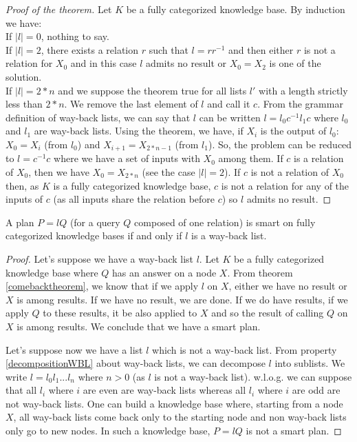 \documentclass[10pt,a4paper,draft]{article}
\begin{document}
\begin{proof}[Proof of the theorem]
Let $K$ be a fully categorized knowledge base. By induction we have: \\
If $|l| = 0$, nothing to say. \\
If $|l| = 2$, there exists a relation $r$ such that $l = r r^{-1}$ and then either $r$ is not a relation for $X_0$ and in this case $l$ admits no result or $X_0 = X_2$ is one of the solution. \\
If $|l| = 2*n$ and we suppose the theorem true for all lists $l'$ with a length strictly less than $2*n$. We remove the last element of $l$ and call it $c$. From the grammar definition of way-back lists, we can say that $l$ can be written $l = l_0 c^{-1} l_1 c$ where $l_0$ and $l_1$ are way-back lists. Using the theorem, we have, if $X_i$ is the output of $l_0$: $X_0 = X_i$ (from $l_0$) and $X_{i+1} = X_{2*n - 1}$ (from $l_1$). So, the problem can be reduced to $l = c^{-1} c$ where we have a set of inputs with $X_0$ among them. If $c$ is a relation of $X_0$, then we have $X_0 = X_{2*n}$ (see the case $|l| = 2$). If $c$ is not a relation of $X_0$ then, as $K$ is a fully categorized knowledge base, $c$ is not a relation for any of the inputs of $c$ (as all inputs share the relation before $c$) so $l$ admits no result.
\end{proof}

\begin{theorem}
\label{descriptiontheorem}
A plan $P = lQ$ (for a query $Q$ composed of one relation) is smart on fully categorized knowledge bases if and only if $l$ is a way-back list.
\end{theorem}

\begin{proof}
Let's suppose we have a way-back list $l$. Let $K$ be a fully categorized knowledge base where $Q$ has an answer on a node $X$. From theorem \ref{comebacktheorem}, we know that if we apply $l$ on $X$, either we have no result or $X$ is among results. If we have no result, we are done. If we do have results, if we apply $Q$ to these results, it be also applied to $X$ and so the result of calling $Q$ on $X$ is among results. We conclude that we have a smart plan.

Let's suppose now we have a list $l$ which is not a way-back list. From property \ref{decompositionWBL} about way-back lists, we can decompose $l$ into sublists. We write $l = l_0 l_1 ... l_n$ where $n > 0$ (as $l$ is not a way-back list). w.l.o.g. we can suppose that all $l_i$ where $i$ are even are way-back lists whereas all $l_i$ where $i$ are odd are not way-back lists. One can build a knowledge base where, starting from a node $X$, all way-back lists come back only to the starting node and non way-back lists only go to new nodes. In such a knowledge base, $P=lQ$ is not a smart plan.
\end{proof}
\end{document}
